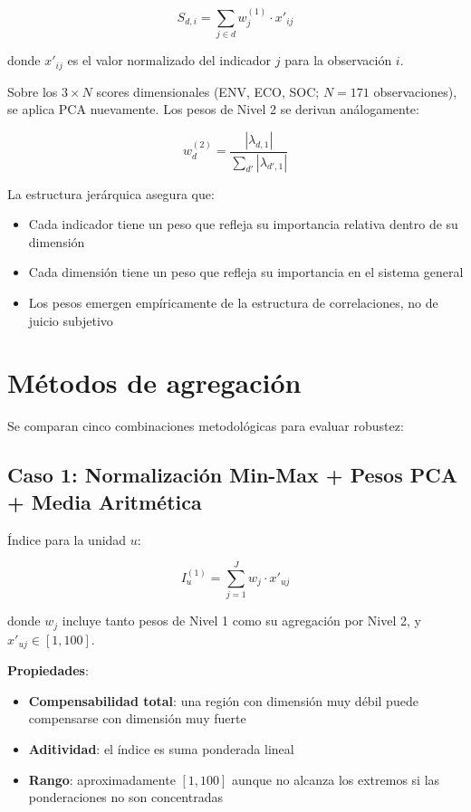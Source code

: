 \begin{equation}
    S_{d,i} = \sum_{j \in d} w_j^{(1)} \cdot x'_{ij}
    \label{eq:score_dim}
\end{equation}

donde $x'_{ij}$ es el valor normalizado del indicador $j$ para la observación $i$.

Sobre los $3 \times N$ scores dimensionales (ENV, ECO, SOC; $N = 171$ observaciones), se aplica PCA nuevamente. Los pesos de Nivel 2 se derivan análogamente:

\begin{equation}
    w_d^{(2)} = \frac{|\lambda_{d,1}|}{\sum_{d'} |\lambda_{d',1}|}
    \label{eq:pesos_l2}
\end{equation}

La estructura jerárquica asegura que:
\begin{itemize}
    \item Cada indicador tiene un peso que refleja su importancia relativa dentro de su dimensión
    \item Cada dimensión tiene un peso que refleja su importancia en el sistema general
    \item Los pesos emergen empíricamente de la estructura de correlaciones, no de juicio subjetivo
\end{itemize}

\section{Métodos de agregación}

Se comparan cinco combinaciones metodológicas para evaluar robustez:

\subsection{Caso 1: Normalización Min-Max + Pesos PCA + Media Aritmética}

Índice para la unidad $u$:

\begin{equation}
    I_u^{(1)} = \sum_{j=1}^{J} w_j \cdot x'_{uj}
    \label{eq:aritmetica}
\end{equation}

donde $w_j$ incluye tanto pesos de Nivel 1 como su agregación por Nivel 2, y $x'_{uj} \in [1, 100]$.

\textbf{Propiedades}:
\begin{itemize}
    \item \textbf{Compensabilidad total}: una región con dimensión muy débil puede compensarse con dimensión muy fuerte
    \item \textbf{Aditividad}: el índice es suma ponderada lineal
    \item \textbf{Rango}: aproximadamente $[1, 100]$ aunque no alcanza los extremos si las ponderaciones no son concentradas
\end{itemize}

